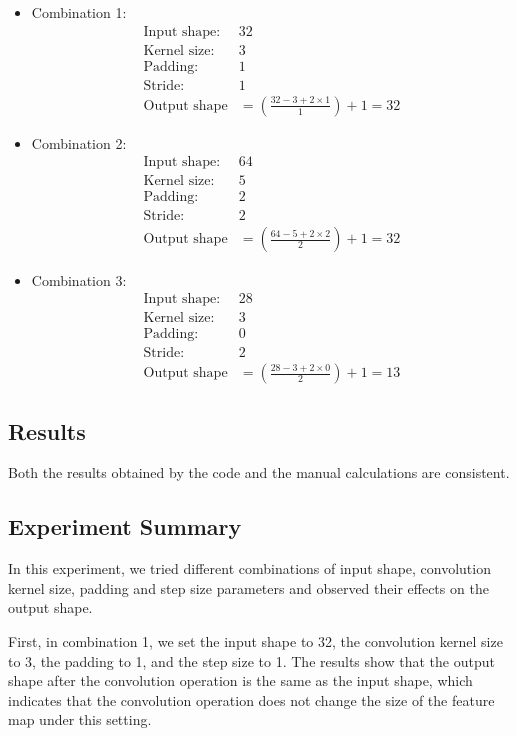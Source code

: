 \documentclass[a4paper,12pt]{article}
\begin{document}
\begin{itemize}
  \item Combination 1:
  \begin{align*}
  \text{Input shape:} & 32 \\
  \text{Kernel size:} & 3 \\
  \text{Padding:} & 1 \\
  \text{Stride:} & 1 \\
  \text{Output shape} & = \left( \frac{32 - 3 + 2 \times 1}{1} \right) + 1 = 32
  \end{align*}

  \item Combination 2:
  \begin{align*}
  \text{Input shape:} & 64 \\
  \text{Kernel size:} & 5 \\
  \text{Padding:} & 2 \\
  \text{Stride:} & 2 \\
  \text{Output shape} & = \left( \frac{64 - 5 + 2 \times 2}{2} \right) + 1 = 32
  \end{align*}

  \item Combination 3:
  \begin{align*}
  \text{Input shape:} & 28 \\
  \text{Kernel size:} & 3 \\
  \text{Padding:} & 0 \\
  \text{Stride:} & 2 \\
  \text{Output shape} & = \left( \frac{28 - 3 + 2 \times 0}{2} \right) + 1 = 13
  \end{align*}
\end{itemize}

\subsection{Results}
Both the results obtained by the code and the manual calculations are consistent.

\subsection{Experiment Summary}
In this experiment, we tried different combinations of input shape, convolution kernel size, padding and step size parameters and observed their effects on the output shape.

First, in combination 1, we set the input shape to 32, the convolution kernel size to 3, the padding to 1, and the step size to 1. The results show that the output shape after the convolution operation is the same as the input shape, which indicates that the convolution operation does not change the size of the feature map under this setting.
\end{document}
